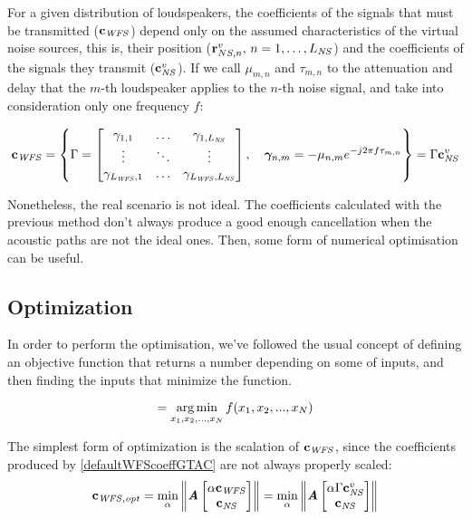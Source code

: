 For a given distribution of loudspeakers, the coefficients of the signals that must be transmitted ($\mathbf{c}_{\mathit{WFS}}$) depend only on the assumed characteristics of the virtual noise sources, this is, their position ($\mathbf{r}_{NS, n}^v,\, n = 1, \ldots, L_\mathit{NS}$) and the coefficients of the signals they transmit ($\mathbf{c}_{\mathit{NS}}^v$). If we call $\mu_{m,n}$ and $\tau_{m,n}$ to the attenuation and delay that the $m$-th loudspeaker applies to the $n$-th noise signal, and take into consideration only one frequency $f$:

\begin{equation}
\cwfs = 
 \left\{ \wfsNormCoef[mat] = \begin{bmatrix}
\wfsNormCoef[scalar]_{1,1} & \ldots & \wfsNormCoef[scalar]_{1,\numNS} \\
\vdots & \ddots & \vdots \\
\wfsNormCoef[scalar]_{\numWFS,1} & \ldots & \wfsNormCoef[scalar]_{\numWFS,\numNS}
\end{bmatrix},\quad \wfsNormCoef_{n,m} = -\mu_{n,m} e^{-j 2 \pi f \tau_{m,n}} 
\right\}
= \wfsNormCoef[mat] \cns^v
\label{defaultWFScoeffGTAC}
\end{equation}

Nonetheless, the real scenario is not ideal. The coefficients calculated with the previous method don't always produce a good enough cancellation when the acoustic paths are not the ideal ones. Then, some form of numerical optimisation can be useful.

\subsection{Optimization} \label{optimization}
In order to perform the optimisation, we've followed the usual concept of defining an objective function that returns a number depending on some of inputs, and then finding the inputs that minimize the function.

\begin{equation}
[x_{\mathit{opt} (1)}, x_{\mathit{opt} (2)}, ..., x_{\mathit{opt} (N)}] = \argmin_{x_1, x_2, ..., x_N} f(x_1, x_2, ..., x_N)
\label{optimisationGeneral}
\end{equation}

The simplest form of optimization is the scalation of $\mathbf{c}_{\mathit{WFS}}$, since the coefficients produced by \autoref{defaultWFScoeffGTAC} are not always properly scaled:
\begin{equation}
	\vec{c}_{\mathit{WFS}, \mathit{opt}} =
	\min_{\alpha}
	\norm{\myMatrix{A}
		\begin{bmatrix}
			\alpha \vec{c_\mathit{WFS}}\\
			\vec{c_\mathit{NS}}\\
		\end{bmatrix}
	} = \min_{\alpha}
\norm{\myMatrix{A}
\begin{bmatrix}
	\alpha \wfsNormCoef[mat] \cns^v\\
	\vec{c_\mathit{NS}}\\
\end{bmatrix}
}\label{OptScalation}
\end{equation}

